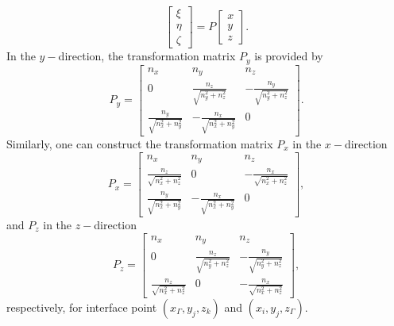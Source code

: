 \documentclass[dissertation]{uathesis}
\begin{document}
\begin{body}
%
\begin{equation}\label{orginal-to-local}
\begin{bmatrix}
\xi \\
\eta \\
\zeta 
\end{bmatrix}
=
P
\begin{bmatrix}
x \\
y \\
z
\end{bmatrix}.
\end{equation}
%
In the $y-$direction, the transformation matrix $P_y$ is provided by
%
\begin{equation}\label{P in y-direction}
P_y=
\begin{bmatrix}
n_{x} &                 n_{y}                    &      n_{z}       \\
0     & \frac{n_{z}}{\sqrt{n^{2}_{y}+n^{2}_{z}}} & -\frac{n_{y}}{\sqrt{n^{2}_{y}+n^{2}_{z}}} \\
\frac{n_{y}}{\sqrt{n^{2}_{x}+n^{2}_{y}}} & -\frac{n_{x}}{\sqrt{n^{2}_{x}+n^{2}_{y}}} & 0
\end{bmatrix}.
\end{equation}
%
Similarly, one can construct the transformation matrix $P_x$ in the $x-$direction
%
\begin{equation}\label{P in x-direction}
P_x=
\begin{bmatrix}
n_{x}                                    &   n_{y}       &      n_{z}       \\
\frac{n_{z}}{\sqrt{n^{2}_{x}+n^{2}_{z}}} & 0             & -\frac{n_{x}}{\sqrt{n^{2}_{x}+n^{2}_{z}}} \\
\frac{n_{y}}{\sqrt{n^{2}_{x}+n^{2}_{y}}} & -\frac{n_{x}}{\sqrt{n^{2}_{x}+n^{2}_{y}}} & 0
\end{bmatrix},
\end{equation}
%
and $P_z$ in the $z-$direction
%
\begin{equation}\label{P in z-direction}
P_z =
\begin{bmatrix}
n_{x} &                   n_{y}                  &                     n_{z}                \\
0     & \frac{n_{z}}{\sqrt{n^{2}_{y}+n^{2}_{z}}} & -\frac{n_{y}}{\sqrt{n^{2}_{y}+n^{2}_{z}}} \\
\frac{n_{z}}{\sqrt{n^{2}_{x}+n^{2}_{z}}}         & 0 &  -\frac{n_{x}}{\sqrt{n^{2}_{x}+n^{2}_{z}}}
\end{bmatrix},
\end{equation}
%
respectively, for interface point $(x_{\Gamma},y_{j},z_{k})$ and $(x_{i},y_{j},z_{\Gamma})$.


\end{body}
\end{document}

